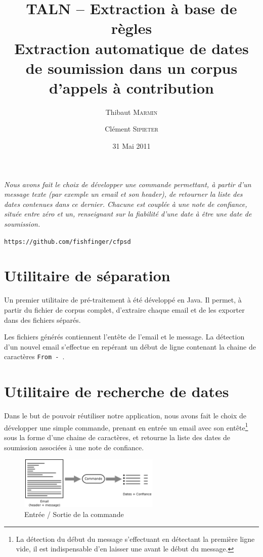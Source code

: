 \documentclass[a4paper,french,10pt]{article}
\title{\textbf{TALN -- Extraction à base de règles\\ \normalsize Extraction automatique de dates de soumission dans un corpus d'appels à contribution}}
\author{Thibaut \textsc{Marmin} \and Clément \textsc{Sipieter}}
\date{31 Mai 2011}
\begin{document}
\maketitle

\emph{Nous avons fait le choix de développer une commande permettant, à partir d'un message texte (par exemple un email et son header), de retourner la liste des dates contenues dans ce dernier. Chacune est couplée à une note de confiance, située entre zéro et un, renseignant sur la fiabilité d'une date à être une date de soumission.}

\begin{center}
\verb+https://github.com/fishfinger/cfpsd+
\end{center}

\section{Utilitaire de séparation}
Un premier utilitaire de pré-traitement à été développé en Java. Il permet, à partir du fichier de corpus complet, d'extraire chaque email et de les exporter dans des fichiers séparés.

Les fichiers générés contiennent l'entête de l'email et le message. La détection d'un nouvel email s'effectue en repérant un début de ligne contenant la chaine de caractères \og \texttt{From - }\fg{}.

\section{Utilitaire de recherche de dates}
Dans le but de pouvoir réutiliser notre application, nous avons fait le choix de développer une simple commande, prenant en entrée un email avec son entête\footnote{La détection du début du message s'effectuant en détectant la première ligne vide, il est indispensable d'en laisser une avant le début du message.} sous la forme d'une chaine de caractères, et retourne la liste des dates de soumission associées à une note de confiance.

\begin{figure}[H]
\centering
\includegraphics[width=0.6\textwidth]{files/archi}
\caption{Entrée / Sortie de la commande}
\end{figure}
\end{document}
